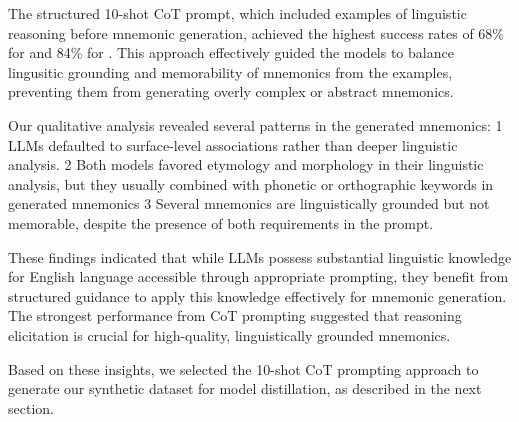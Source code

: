 The structured 10-shot CoT prompt, which included examples of linguistic reasoning before mnemonic generation, achieved the highest success rates of 68\% for \xteachermodel and 84\% for \teachermodel. This approach effectively guided the models to balance lingusitic grounding and memorability of mnemonics from the examples, preventing them from generating overly complex or abstract mnemonics.

Our qualitative analysis revealed several patterns in the generated mnemonics: \numlist{1} LLMs defaulted to surface-level associations rather than deeper linguistic analysis. \numlist{2} Both models favored etymology and morphology in their linguistic analysis, but they usually combined with phonetic or orthographic keywords in generated mnemonics \numlist{3} Several mnemonics are linguistically grounded but not memorable, despite the presence of both requirements in the prompt.

These findings indicated that while LLMs possess substantial linguistic knowledge for English language accessible through appropriate prompting, they benefit from structured guidance to apply this knowledge effectively for mnemonic generation. The strongest performance from CoT prompting suggested that reasoning elicitation is crucial for high-quality, linguistically grounded mnemonics.

Based on these insights, we selected the 10-shot CoT prompting approach to generate our synthetic dataset for model distillation, as described in the next section.
